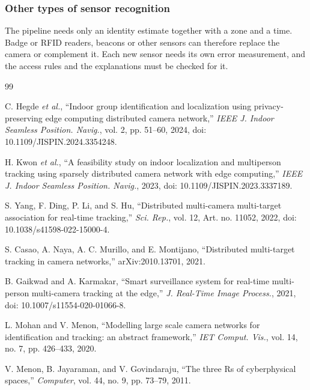 \documentclass[12pt,a4paper,oneside]{report}
\begin{document}
\subsubsection{Other types of sensor recognition}
The pipeline needs only an identity estimate together with a zone and a time. Badge or RFID readers, beacons or other sensors can therefore replace the camera or complement it. Each new sensor needs its own error measurement, and the access rules and the explanations must be checked for it.

\clearpage
\renewcommand{\bibname}{References}

\begin{thebibliography}{99}
{}

\setlength{\itemsep}{6pt}
\setlength{\parskip}{0pt}

C. Hegde \textit{et al.},
``Indoor group identification and localization using privacy-preserving edge computing distributed camera network,''
\textit{IEEE J. Indoor Seamless Position. Navig.},
vol. 2, pp. 51--60,
2024, doi: 10.1109/JISPIN.2024.3354248.

H. Kwon \textit{et al.},
``A feasibility study on indoor localization and multiperson tracking using sparsely distributed camera network with edge computing,''
\textit{IEEE J. Indoor Seamless Position. Navig.},
2023, doi: 10.1109/JISPIN.2023.3337189.

S. Yang, F. Ding, P. Li, and S. Hu,
``Distributed multi-camera multi-target association for real-time tracking,''
\textit{Sci. Rep.},
vol. 12,
Art. no. 11052, 2022,
doi: 10.1038/s41598-022-15000-4.

S. Casao, A. Naya, A. C. Murillo, and E. Montijano,
``Distributed multi-target tracking in camera networks,''
arXiv:2010.13701, 2021.

B. Gaikwad and A. Karmakar,
``Smart surveillance system for real-time multi-person multi-camera tracking at the edge,''
\textit{J. Real-Time Image Process.},
2021, doi: 10.1007/s11554-020-01066-8.

L. Mohan and V. Menon,
``Modelling large scale camera networks for identification and tracking: an abstract framework,''
\textit{IET Comput. Vis.},
vol. 14, no. 7, pp. 426--433,
2020.

V. Menon, B. Jayaraman, and V. Govindaraju,
``The three Rs of cyberphysical spaces,''
\textit{Computer},
vol. 44, no. 9, pp. 73--79,
2011.


\end{thebibliography}
\end{document}
